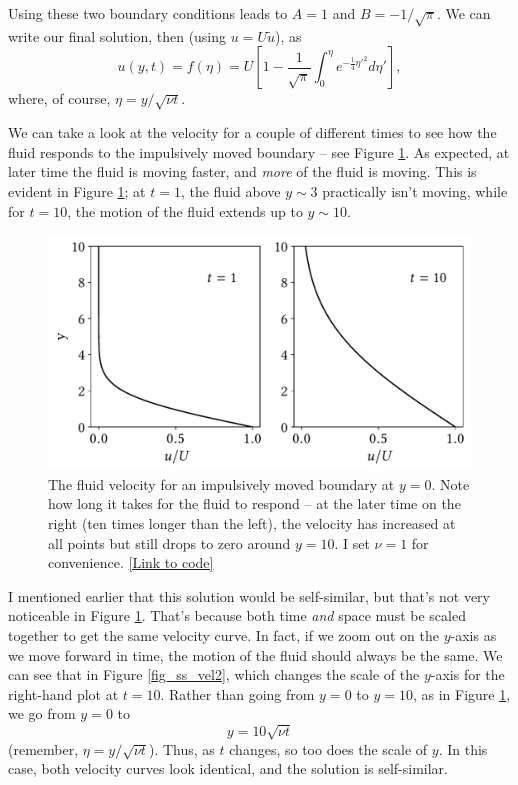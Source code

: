 Using these two boundary conditions leads to $A=1$ and $B = -1/\sqrt{\pi}$.  We can write our final solution, then (using $u = U\tilde{u}$), as
\begin{equation}
u(y, t) = f(\eta) = U\left[ 1 - \frac{1}{\sqrt{\pi}} \int_0^\eta e^{-\tfrac{1}{4} \eta'^2} d\eta' \right],
\end{equation}
where, of course, $\eta = y / \sqrt{\nu t}$.

We can take a look at the velocity for a couple of different times to see how the fluid responds to the impulsively moved boundary -- see Figure \ref{fig_ss_vel1}.  As expected, at later time the fluid is moving faster, and \emph{more} of the fluid is moving.  This is evident in Figure \ref{fig_ss_vel1}; at $t=1$, the fluid above $y \sim 3$ practically isn't moving, while for $t=10$, the motion of the fluid extends up to $y \sim 10$.

\begin{figure}
\centering
\includegraphics[width=0.8\linewidth]{Figures/Chapter2/fig_ss_vel1}
\caption{The fluid velocity for an impulsively moved boundary at $y=0$.  Note how long it takes for the fluid to respond -- at the later time on the right (ten times longer than the left), the velocity has increased at all points but still drops to zero around $y=10$.  I set $\nu = 1$ for convenience. \href{https://nbviewer.jupyter.org/github/josephmacmillan/IntroFluidDynamics/blob/master/Jupyter/2-ViscousFluids.ipynb\#Figure-2.7:-Self-similar-flow}{[Link to code]} }
\label{fig_ss_vel1}
\end{figure}

I mentioned earlier that this solution would be self-similar, but that's not very noticeable in Figure \ref{fig_ss_vel1}.  That's because both time \emph{and} space must be scaled together to get the same velocity curve.  In fact, if we zoom out on the $y$-axis as we move forward in time, the motion of the fluid should always be the same.  We can see that in Figure \ref{fig_ss_vel2}, which changes the scale of the $y$-axis for the right-hand plot at $t=10$.  Rather than going from $y=0$ to $y=10$, as in Figure \ref{fig_ss_vel1}, we go from $y=0$ to
\[
y = {10}{\sqrt{\nu t}}
\]
(remember, $\eta = y / \sqrt{\nu t}$).  Thus, as $t$ changes, so too does the scale of $y$.  In this case, both velocity curves look identical, and the solution is self-similar.

